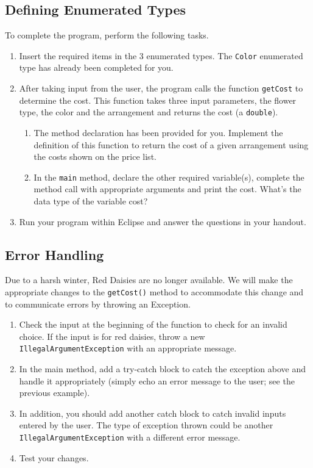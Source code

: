 \documentclass[12pt]{scrartcl}
\begin{document}
\subsection{Defining Enumerated Types}

To complete the program, perform the following tasks.
\begin{enumerate}
  \item Insert the required items in the 3 enumerated types.  The \texttt{Color} 
  	enumerated type has already been completed for you.  
  \item After taking input from the user, the program calls the function 
	\texttt{getCost} to determine the cost. This function takes three 
	input parameters, the flower type, the color and the arrangement and 
	returns the cost (a \texttt{double}).
	\begin{enumerate}
	  \item The method declaration has been provided for you. Implement the 
	  definition of this function to return the cost of a given arrangement using 
	  the costs shown on the price list.
	  \item In the \texttt{main} method, declare the other required variable(s), complete 
	  the method call with appropriate arguments and print the cost. What's the 
	  data type of the variable cost?
	\end{enumerate}
  \item Run your program within Eclipse and answer the questions in your handout.
\end{enumerate}

\subsection{Error Handling}

Due to a harsh winter, Red Daisies are no longer available.  We will make 
the appropriate changes to the \texttt{getCost()} method to accommodate 
this change and to communicate errors by throwing an Exception.
\begin{enumerate}
  \item Check the input at the beginning of the function to check for an invalid choice.  
  	If the input is for red daisies, throw a new \texttt{IllegalArgumentException} 
	with an appropriate message.
  \item In the main method, add a try-catch block to catch the exception above and handle 
	it appropriately (simply echo an error message to the user; see the previous example).
  \item In addition, you should add another catch block to catch invalid inputs entered by 
	the user.  The type of exception thrown could be another \texttt{IllegalArgumentException} 
	with a different error message.
  \item Test your changes.
\end{enumerate}
\end{document}

